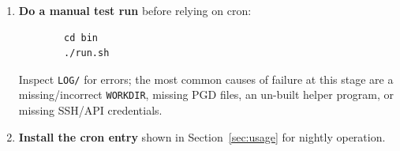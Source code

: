 \begin{enumerate}
        geometry, nesting configuration or ground/topography input files change; it is otherwise a
        one-time step per site.
  \item \textbf{Do a manual test run} before relying on cron:
        \begin{lstlisting}
        cd bin
        ./run.sh
        \end{lstlisting}
        Inspect \texttt{LOG/} for errors; the most common causes of failure at this stage are a
        missing/incorrect \texttt{WORKDIR}, missing PGD files, an un-built helper program, or missing
        SSH/API credentials.
  \item \textbf{Install the cron entry} shown in Section~\ref{sec:usage} for nightly operation.
\end{enumerate}
